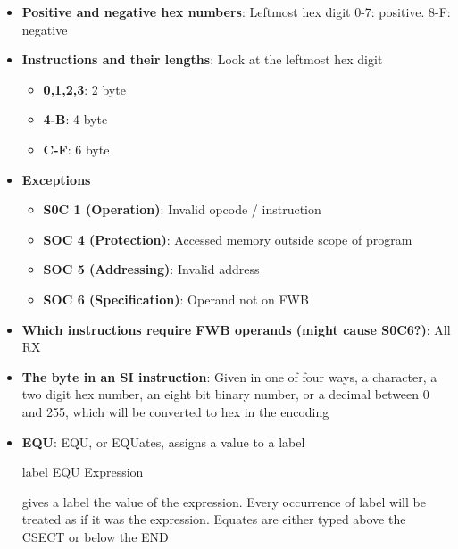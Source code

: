 \documentclass{report}
\begin{document}
    \begin{itemize}
        \item \textbf{Positive and negative hex numbers}: Leftmost hex digit 0-7: positive. 8-F: negative
        \item \textbf{Instructions and their lengths}: Look at the leftmost hex digit
            \begin{itemize}
                \item \textbf{0,1,2,3}: 2 byte
                \item \textbf{4-B}: 4 byte
                \item \textbf{C-F}: 6 byte
            \end{itemize}
        \item \textbf{Exceptions}
            \begin{itemize}
                \item \textbf{S0C 1 (Operation)}: Invalid opcode / instruction
                \item \textbf{SOC 4 (Protection)}: Accessed memory outside scope of program
                \item \textbf{SOC 5 (Addressing)}: Invalid address
                \item \textbf{SOC 6 (Specification)}: Operand not on FWB
            \end{itemize}
        \item \textbf{Which instructions require FWB operands (might cause S0C6?)}: All RX
        \item \textbf{The byte in an SI instruction}: Given in one of four ways, a character, a two digit hex number,  an eight bit binary number, or a decimal between 0 and 255, which will be converted to hex in the encoding
            \bigbreak \noindent 
        \item \textbf{EQU}: EQU, or EQUates, assigns a value to a label
            \bigbreak \noindent 
            \begin{cppcode}
            label    EQU    Expression
            \end{cppcode}
            \bigbreak \noindent 
            gives a label the value of the expression. Every occurrence of label will be treated as if it was the expression.
            \bigbreak \noindent 
            Equates are either typed above the CSECT or below the END

\end{itemize}
\end{document}
